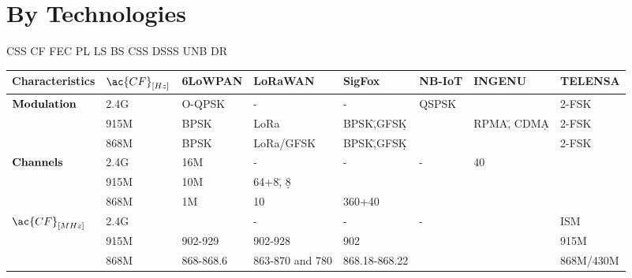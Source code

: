 \onecolumn
\section{By Technologies}
\setlength{\hoffset}{-.5in}

\ac{CSS} \ac{CF} \ac{FEC}  \ac{PL} \ac{LS} \ac{BS} \ac{CSS} \ac{DSSS} \ac{UNB} \ac{DR}


\begin{longtable}{l|l|l|l|l|l|l|l}
	\bf{Characteristics}               & $\ac{CF}_{[Hz]}$ & \bf{6LoWPAN} & \bf{LoRaWAN}     & \bf{SigFox}   & \bf{NB-IoT} & \textbf{INGENU}    & \textbf{TELENSA}\\\hline
	\multirow{3}{*}{$\bf{Modulation}$} & 2.4G             & O-QPSK       & -                & -             & QSPSK       &                    & 2-FSK           \\
	\                                  & 915M             & BPSK         & LoRa             & BPSK\u,GFSK\d &             & RPMA\u,	CDMA\d     & 2-FSK           \\
	\                                  & 868M             & BPSK         & LoRa/GFSK        & BPSK\u,GFSK\d &             &                    & 2-FSK           \\\hline
	\multirow{3}{*}{$\bf{Channels}$}   & 2.4G             & 16M          & -                & -             & -           & 40                 & \ko             \\
	\                                  & 915M             & 10M          & 64+8\u, 8\d      & \ko           & \ko         & \ko                & \ko             \\
	\                                  & 868M             & 1M           & 10               & 360+40        & \ko         & \ko                & \ko             \\\hline
	\multirow{2}{*}{$\ac{CF}_{[MHz]}$} & 2.4G             & \ko          & -                & -             & -           & \ko                & ISM             \\
	\                                  & 915M             & 902-929      & 902-928          & 902           & \ko         & \ko                & 915M            \\
	\                                  & 868M             & 868-868.6    & 863-870 and 780  & 868.18-868.22 & \ko         & \ko                & 868M/430M       \\\hline

\end{longtable}
